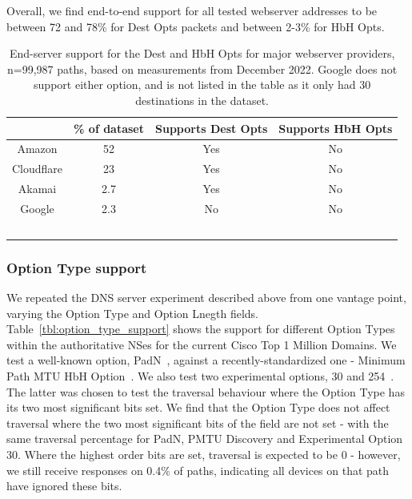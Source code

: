 \documentclass[conference]{IEEEtran}
\begin{document}
Overall, we find end-to-end support for all tested webserver addresses to be between 72 and 78\% for Dest Opts packets and between 2-3\% for HbH Opts.


\begin{table} 
\begin{tabular}{c|c|c|c}
           & \% of dataset & Supports Dest Opts & Supports HbH Opts \\
\hline
Amazon & 52                      & Yes                & No                 \\
\hline
Cloudflare     & 23                     & Yes                 & No                 \\
\hline
Akamai    & 2.7                     & Yes                & No                 \\
\hline
Google      & 2.3                     & No                 & No                 \\
\
\end{tabular}
\label{tbl:web_provider_support}
\caption{End-server support for the Dest and HbH Opts for major webserver providers, n=99,987 paths, based on measurements from December 2022. Google does not support either option, and is not listed in the table as it only had 30 destinations in the dataset.
}
\end{table}


\subsubsection{Option Type support}

We repeated the DNS server experiment described above from one vantage point, varying the Option Type and Option Lnegth fields. 
Table~\ref{tbl:option_type_support} shows the support for different Option Types within the authoritative NSes for the current Cisco Top 1 Million Domains. We test a well-known option, PadN~\cite{rfc2460}, against a recently-standardized one - Minimum Path MTU HbH Option~\cite{rfc9268}. We also test two experimental options, 30 and 254~\cite{RFC4727}. The latter was chosen to test the traversal behaviour where the Option Type has its two most significant bits set.
We find that the Option Type does not affect traversal where the two most significant bits of the field are not set - with the same traversal percentage for PadN, PMTU Discovery and Experimental Option 30. Where the highest order bits are set, traversal is expected to be 0 - however, we still receive responses on 0.4\% of paths, indicating all devices on that path have ignored these bits.
\end{document}
